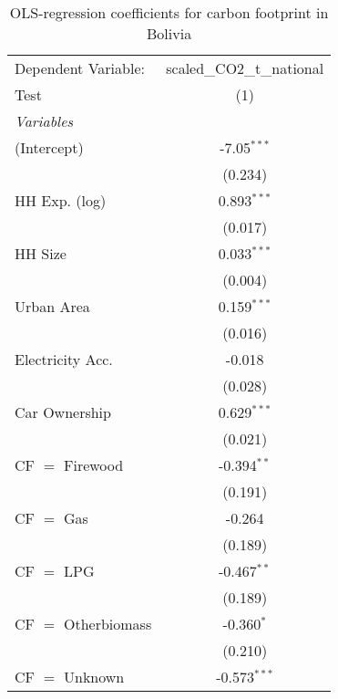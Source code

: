 
\begin{table}[htbp!]
   \centering
   \small
   \begin{adjustbox}{width = 1\textwidth, max height = 0.95\textheight, center}
      \begin{threeparttable}[b]
         \caption{\label{tab:OLS_2_BOL} OLS-regression coefficients for carbon footprint in Bolivia}
         \begin{tabular}{lc}
            \tabularnewline \midrule \midrule
            Dependent Variable: & scaled\_CO2\_t\_national\\     
            Test                & (1)\\  
            \midrule
            \emph{Variables}\\
            (Intercept)         & -7.05$^{***}$\\   
                                & (0.234)\\   
            HH Exp. (log)       & 0.893$^{***}$\\   
                                & (0.017)\\   
            HH Size             & 0.033$^{***}$\\   
                                & (0.004)\\   
            Urban Area          & 0.159$^{***}$\\   
                                & (0.016)\\   
            Electricity Acc.    & -0.018\\   
                                & (0.028)\\   
            Car Ownership       & 0.629$^{***}$\\   
                                & (0.021)\\   
            CF $=$ Firewood     & -0.394$^{**}$\\   
                                & (0.191)\\   
            CF $=$ Gas          & -0.264\\   
                                & (0.189)\\   
            CF $=$ LPG          & -0.467$^{**}$\\   
                                & (0.189)\\   
            CF $=$ Otherbiomass & -0.360$^{*}$\\   
                                & (0.210)\\   
            CF $=$ Unknown      & -0.573$^{***}$\\   

\end{tabular}
\end{threeparttable}
\end{adjustbox}
\end{table}
